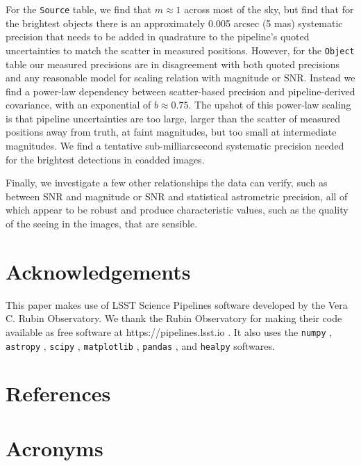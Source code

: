 \documentclass[SE,authoryear,toc]{lsstdoc}
\begin{document}
For the \texttt{Source} table, we find that $m \approx 1$ across most of the sky, but find that for the brightest objects there is an approximately 0.005 arcsec (5 mas) systematic precision that needs to be added in quadrature to the pipeline's quoted uncertainties to match the scatter in measured positions.
However, for the \texttt{Object} table our measured precisions are in disagreement with both quoted precisions and any reasonable model for scaling relation with magnitude or SNR.
Instead we find a power-law dependency between scatter-based precision and pipeline-derived covariance, with an exponential of $b \approx 0.75$.
The upshot of this power-law scaling is that pipeline uncertainties are too large, larger than the scatter of measured positions away from truth, at faint magnitudes, but too small at intermediate magnitudes.
We find a tentative sub-milliarcsecond systematic precision needed for the brightest detections in coadded images.

Finally, we investigate a few other relationships the data can verify, such as between SNR and magnitude or SNR and statistical astrometric precision, all of which appear to be robust and produce characteristic values, such as the quality of the seeing in the images, that are sensible.

\section{Acknowledgements}
This paper makes use of LSST Science Pipelines software developed by the Vera C. Rubin Observatory. We thank the Rubin Observatory for making their code available as free software at https://pipelines.lsst.io \citep{NDVRO2025,Jenness2022}.
It also uses the \texttt{numpy} \citep{Harris2020}, \texttt{astropy} \citep{2013A&A...558A..33A,2018AJ....156..123A}, \texttt{scipy} \citep{scipy}, \texttt{matplotlib} \citep{matplotlib}, \texttt{pandas} \citep{mckinney-proc-scipy-2010-pandas}, and \texttt{healpy} \citep{Zonca2019,2005ApJ...622..759G} softwares.

\appendix
\section{References} \label{sec:bib}
\renewcommand{\refname}{} %


\section{Acronyms} \label{sec:acronyms}

\end{document}
